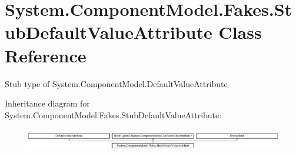 \hypertarget{class_system_1_1_component_model_1_1_fakes_1_1_stub_default_value_attribute}{\section{System.\-Component\-Model.\-Fakes.\-Stub\-Default\-Value\-Attribute Class Reference}
\label{class_system_1_1_component_model_1_1_fakes_1_1_stub_default_value_attribute}
}


Stub type of System.\-Component\-Model.\-Default\-Value\-Attribute 


Inheritance diagram for System.\-Component\-Model.\-Fakes.\-Stub\-Default\-Value\-Attribute\-:\begin{figure}[H]
\begin{center}
\leavevmode
\includegraphics[height=0.992908cm]{class_system_1_1_component_model_1_1_fakes_1_1_stub_default_value_attribute}
\end{center}
\end{figure}
